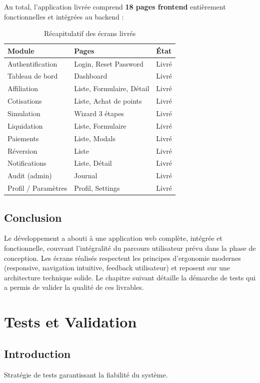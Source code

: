 \documentclass[12pt,a4paper,oneside]{report}
\begin{document}
Au total, l'application livrée comprend \textbf{18 pages frontend} entièrement fonctionnelles et intégrées au backend :

\begin{table}[H]
\centering
\caption{Récapitulatif des écrans livrés}
\begin{tabular}{lll}
\toprule
\textbf{Module} & \textbf{Pages} & \textbf{État} \\
\midrule
Authentification & Login, Reset Password & Livré \\
Tableau de bord & Dashboard & Livré \\
Affiliation & Liste, Formulaire, Détail & Livré \\
Cotisations & Liste, Achat de points & Livré \\
Simulation & Wizard 3 étapes & Livré \\
Liquidation & Liste, Formulaire & Livré \\
Paiements & Liste, Modals & Livré \\
Réversion & Liste & Livré \\
Notifications & Liste, Détail & Livré \\
Audit (admin) & Journal & Livré \\
Profil / Paramètres & Profil, Settings & Livré \\
\bottomrule
\end{tabular}
\end{table}

\section{Conclusion}
Le développement a abouti à une application web complète, intégrée et fonctionnelle, couvrant l'intégralité du parcours utilisateur prévu dans la phase de conception. Les écrans réalisés respectent les principes d'ergonomie modernes (responsive, navigation intuitive, feedback utilisateur) et reposent sur une architecture technique solide. Le chapitre suivant détaille la démarche de tests qui a permis de valider la qualité de ces livrables.

\chapter{Tests et Validation}

\section{Introduction}
Stratégie de tests garantissant la fiabilité du système.
\end{document}
